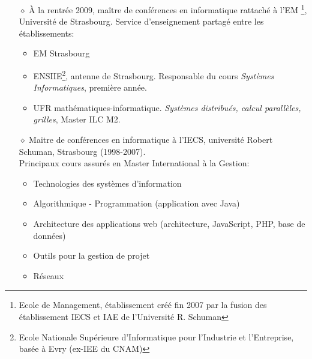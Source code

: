 \begin{itemize}

\item[$\diamond$] \`A la rentrée 2009, maître de conférences en informatique rattaché à l'EM%
\footnote{Ecole de Management, établissement créé fin 2007 par la fusion des établissement IECS et IAE de l'Université R. Schuman}, 
Université de Strasbourg. Service d'enseignement partagé entre les établissements:
\begin{itemize}
	\item EM Strasbourg
	\item ENSIIE\footnote{Ecole Nationale Supérieure d'Informatique pour l'Industrie et l'Entreprise, basée à Evry (ex-IEE du CNAM)}, antenne de Strasbourg. Responsable du cours \textit{Systèmes Informatiques}, première année.
      \item UFR mathématiques-informatique. \textit{Systèmes distribués, calcul parallèles, grilles}, Master ILC M2. \\[2mm]
\end{itemize}

\item[$\diamond$] Maitre de conférences en informatique à l'IECS, université Robert Schuman, Strasbourg (1998-2007).\\
	Principaux cours assurés en Master International à la Gestion:
\begin{itemize}
	\item Technologies des systèmes d'information
	\item Algorithmique - Programmation (application avec Java)
	\item Architecture des applications web (architecture, JavaScript, PHP, base de données)
	\item Outils pour la gestion de projet
	\item Réseaux \\[2mm]
\end{itemize}


\end{itemize}

